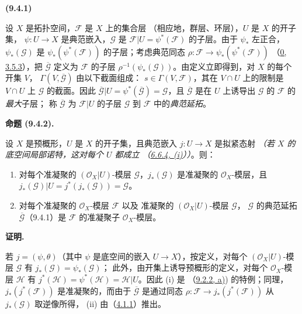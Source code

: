 \documentclass[UTF8,fontset=none,11pt,oneside,openany]{ctexbook}
\newenvironment{env}[1][]{%
  \par\medskip\noindent\textbf{(#1)}\ %
}{\par}
\newenvironment{proposition}[1][]{%
  \par\medskip\noindent\textbf{命题 (#1).}\ %
}{\par}
\newenvironment{proof}{%
  \par\medskip\noindent\textbf{证明.}\ %
}{\par}
\let\EGAOriginalLabel\label
\renewcommand{\label}[1]{\phantomsection\EGAOriginalLabel{#1}}
\begin{document}
\begin{env}[9.4.1]
\label{I.9.4.1-fr}
设 $X$ 是拓扑空间，$\mathscr{F}$ 是 $X$ 上的集合层
（相应地，群层、环层），$U$ 是 $X$ 的开子集，
$\psi:U\to X$ 是典范嵌入，$\mathscr{G}$ 是
$\mathscr{F}|U=\psi^*(\mathscr{F})$ 的子层。由于 $\psi_*$ 左正合，
$\psi_*(\mathscr{G})$ 是 $\psi_*(\psi^*(\mathscr{F}))$ 的子层；考虑典范同态
$\rho:\mathscr{F}\to\psi_*(\psi^*(\mathscr{F}))$
（\hyperref[0.3.5.3-fr]{0, 3.5.3}），把
$\overline{\mathscr{G}}$ 定义为 $\mathscr{F}$ 的子层
$\rho^{-1}(\psi_*(\mathscr{G}))$。由定义立即得到，对 $X$ 的每个开集 $V$，
$\Gamma(V,\overline{\mathscr{G}})$ 由以下截面组成：
$s\in\Gamma(V,\mathscr{F})$，其在 $V\cap U$ 上的限制是
$V\cap U$ 上 $\mathscr{G}$ 的截面。因此
$\overline{\mathscr{G}}|U=\psi^*(\overline{\mathscr{G}})=\mathscr{G}$，且
$\overline{\mathscr{G}}$ 是在 $U$ 上诱导出 $\mathscr{G}$ 的 $\mathscr{F}$ 的\emph{最大}子层；
称 $\overline{\mathscr{G}}$ 为 $\mathscr{F}|U$ 的子层
$\mathscr{G}$ 到 $\mathscr{F}$ 中的\emph{典范延拓}。
\end{env}

\begin{proposition}[9.4.2]
\label{I.9.4.2-fr}
设 $X$ 是预概形，$U$ 是 $X$ 的开子集，且典范嵌入
$j:U\to X$ 是拟紧态射
\emph{（若 $X$ 的底空间\emph{局部诺特}，这对\emph{每个} $U$ 都成立
（\hyperref[I.6.6.4-fr]{6.6.4, (i)}））}。则：
\begin{enumerate}
\item[(i)] 对每个准凝聚的 $(\mathscr{O}_X|U)$-模层
  $\mathscr{G}$，$j_*(\mathscr{G})$ 是准凝聚的 $\mathscr{O}_X$-模层，且
  $j_*(\mathscr{G})|U=j^*(j_*(\mathscr{G}))=\mathscr{G}$。
\item[(ii)] 对每个准凝聚的 $\mathscr{O}_X$-模层 $\mathscr{F}$ 以及
  准凝聚的 $(\mathscr{O}_X|U)$-模层 $\mathscr{G}$，
  $\mathscr{G}$ 的典范延拓 $\overline{\mathscr{G}}$（9.4.1）是
  $\mathscr{F}$ 的准凝聚子 $\mathscr{O}_X$-模层。
\end{enumerate}
\end{proposition}

\begin{proof}
若 $j=(\psi,\theta)$（其中 $\psi$ 是底空间的嵌入 $U\to X$），按定义，对每个
$(\mathscr{O}_X|U)$-模层 $\mathscr{G}$ 有 $j_*(\mathscr{G})=\psi_*(\mathscr{G})$；
此外，由开集上诱导预概形的定义，对每个 $\mathscr{O}_X$-模层 $\mathscr{H}$ 有
$j^*(\mathscr{H})=\psi^*(\mathscr{H})=\mathscr{H}|U$。因此 (i) 是
（\hyperref[I.9.2.2-fr]{9.2.2, a)}) 的特例；同理，
$j_*(j^*(\mathscr{F}))$ 是准凝聚的，而由于
$\overline{\mathscr{G}}$ 是通过同态
$\rho:\mathscr{F}\to j_*(j^*(\mathscr{F}))$ 从 $j_*(\mathscr{G})$ 取逆像所得，
(ii) 由（\hyperref[I.4.1.1-fr]{4.1.1}）推出。
\end{proof}
\end{document}
